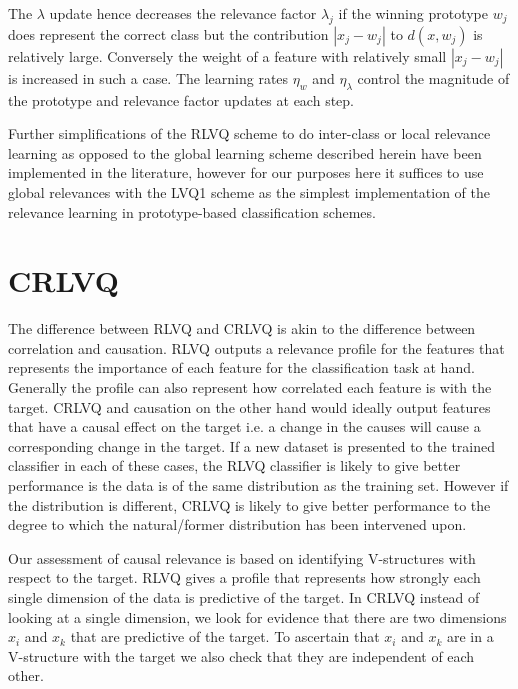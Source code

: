 \documentclass{esannV2}
\begin{document}
The $\lambda$ update hence decreases the relevance factor $\lambda_j$ if the winning prototype $w_j$ does represent the correct class but the contribution $|x_j - w_j|$ to $d(x,w_j)$ is relatively large. Conversely the weight of a feature with relatively small $|x_j - w_j|$ is increased in such a case. The learning rates $\eta_w$ and $\eta_\lambda$ control the magnitude of the prototype and relevance factor updates at each step.

Further simplifications of the RLVQ scheme to do inter-class or local relevance learning as opposed to the global learning scheme described herein have been implemented in the literature, however for our purposes here it suffices to use global relevances with the LVQ1 scheme as the simplest implementation of the relevance learning in prototype-based classification schemes. 

\section{CRLVQ}
\label{sec:CRLVQ}

The difference between RLVQ and CRLVQ is akin to the difference between correlation and causation. RLVQ outputs a relevance profile for the features that represents the importance of each feature for the classification task at hand. Generally the profile can also represent how correlated each feature is with the target. CRLVQ and causation on the other hand would ideally output features that have a causal effect on the target i.e. a change in the causes will cause a corresponding change in the target. If a new dataset is presented to the trained classifier in each of these cases, the RLVQ classifier is likely to give better performance is the data is of the same distribution as the training set. However if the distribution is different, CRLVQ is likely to give better performance to the degree to which the natural/former distribution has been intervened upon.

Our assessment of causal relevance is based on identifying V-structures with respect to the target. RLVQ gives a profile that represents how strongly each single dimension of the data is predictive of the target. In CRLVQ instead of looking at a single dimension, we look for evidence that there are two dimensions $x_i$ and $x_k$ that are predictive of the target. To ascertain that $x_i$ and $x_k$ are in a V-structure with the target we also check that they are independent of each other.
\end{document}
